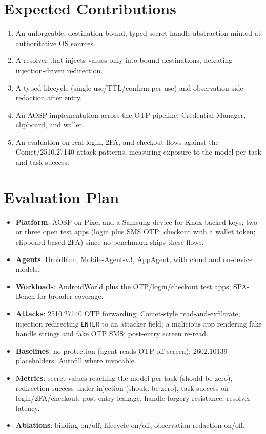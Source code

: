 \documentclass[11pt]{article}
\begin{document}
\section{Expected Contributions}
\begin{enumerate}
  \item An unforgeable, destination-bound, typed secret-handle abstraction minted at authoritative OS sources.
  \item A resolver that injects values only into bound destinations, defeating injection-driven redirection.
  \item A typed lifecycle (single-use/TTL/confirm-per-use) and observation-side redaction after entry.
  \item An AOSP implementation across the OTP pipeline, Credential Manager, clipboard, and wallet.
  \item An evaluation on real login, 2FA, and checkout flows against the Comet/2510.27140 attack patterns, measuring exposure to the model per task and task success.
\end{enumerate}

\section{Evaluation Plan}
\begin{itemize}
  \item \textbf{Platform}: AOSP on Pixel and a Samsung device for Knox-backed keys; two or three open test apps (login plus SMS OTP; checkout with a wallet token; clipboard-based 2FA) since no benchmark ships these flows.
  \item \textbf{Agents}: DroidRun, Mobile-Agent-v3, AppAgent, with cloud and on-device models.
  \item \textbf{Workloads}: AndroidWorld plus the OTP/login/checkout test apps; SPA-Bench for broader coverage.
  \item \textbf{Attacks}: 2510.27140 OTP forwarding; Comet-style read-and-exfiltrate; injection redirecting \texttt{ENTER} to an attacker field; a malicious app rendering fake handle strings and fake OTP SMS; post-entry screen re-read.
  \item \textbf{Baselines}: no protection (agent reads OTP off screen); 2602.10139 placeholders; Autofill where invocable.
  \item \textbf{Metrics}: secret values reaching the model per task (should be zero), redirection success under injection (should be zero), task success on login/2FA/checkout, post-entry leakage, handle-forgery resistance, resolver latency.
  \item \textbf{Ablations}: binding on/off; lifecycle on/off; observation redaction on/off.
\end{itemize}
\end{document}

